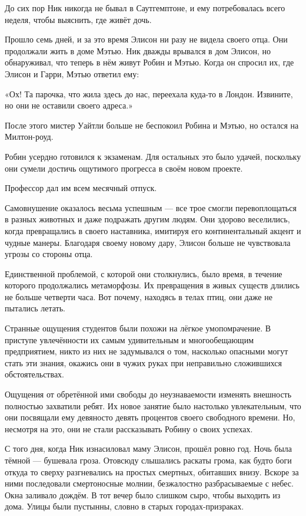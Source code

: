 \documentclass[a4paper,12pt]{book}
\begin{document}
\par
До сих пор Ник никогда не бывал в Саутгемптоне, и ему потребовалась всего неделя, чтобы выяснить, где живёт дочь.\\
\par
Прошло семь дней, и за это время Элисон ни разу не видела своего отца. Они продолжали жить в доме Мэтью. Ник дважды врывался в дом Элисон, но обнаруживал, что теперь в нём живут Робин и Мэтью. Когда он спросил их, где Элисон и Гарри, Мэтью ответил ему:
\par
«Ох! Та парочка, что жила здесь до нас, переехала куда-то в Лондон. Извините, но они не оставили своего адреса.»
\par
После этого мистер Уайтли больше не беспокоил Робина и Мэтью, но остался на Милтон-роуд.\\
\par
Робин усердно готовился к экзаменам. Для остальных это было удачей, поскольку они сумели достичь ощутимого прогресса в своём новом проекте.
\par
Профессор дал им всем месячный отпуск.
\par
Самовнушение оказалось весьма успешным — все трое смогли перевоплощаться в разных животных и даже подражать другим людям. Они здорово веселились, когда  превращались в своего наставника, имитируя его континентальный акцент и чудные манеры. Благодаря своему новому дару, Элисон больше не чувствовала угрозы со стороны отца.
\par
Единственной проблемой, с которой они столкнулись, было время, в течение которого продолжались метаморфозы. Их превращения в живых существ длились не больше четверти часа. Вот почему, находясь в телах птиц, они даже не пытались летать.
\par
Странные ощущения студентов были похожи на лёгкое умопомрачение. В приступе увлечённости их самым удивительным и многообещающим предприятием, никто из них не задумывался о том, насколько опасными могут стать эти знания, окажись они в чужих руках при неправильно сложившихся обстоятельствах.
\par
Ощущения от обретённой ими свободы до неузнаваемости изменять внешность полностью захватили ребят. Их новое занятие было настолько увлекательным, что они посвящали ему девяносто девять процентов своего свободного времени. Но, несмотря на это, они не стали рассказывать Робину о своих успехах.\\
\par
С того дня, когда Ник изнасиловал маму Элисон, прошёл ровно год. Ночь была тёмной — бушевала гроза. Отовсюду слышались раскаты грома, как будто боги откуда то сверху разгневались на простых смертных, обитавших внизу. Вскоре за ними последовали смертоносные молнии, безжалостно разбрасываемые с небес. Окна заливало дождём. В тот вечер было слишком сыро, чтобы выходить из дома. Улицы были пустынны, словно в старых городах-призраках.
\end{document}
